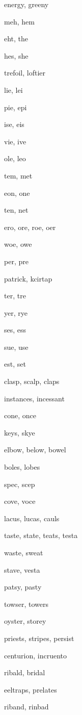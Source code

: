     \item energy, greeny
    \item meh, hem
    \item eht, the
    \item hes, she
    \item trefoil, loftier
    \item lie, lei
    \item pie, epi
    \item ise, eis
    \item vie, ive
    \item ole, leo
    \item tem, met
    \item eon, one
    \item ten, net
    \item ero, ore, roe, oer
    \item woe, owe
    \item per, pre
    \item patrick, kcirtap
    \item ter, tre
    \item yer, rye
    \item ses, ess
    \item sue, use
    \item est, set
    \item clasp, scalp, claps
    \item instances, incessant
    \item cone, once
    \item keys, skye
    \item elbow, below, bowel
    \item boles, lobes
    \item spec, scep
    \item cove, voce
    \item lacus, lucas, cauls
    \item taste, state, teats, testa
    \item waste, sweat
    \item stave, vesta
    \item patsy, pasty
    \item towser, towers
    \item oyster, storey
    \item priests, stripes, persist
    \item centurion, incruento
    \item ribald, bridal
    \item eeltraps, prelates
    \item riband, rinbad
